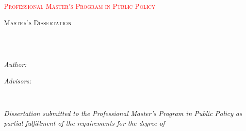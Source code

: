 \documentclass[12pt,oneside]{MastersDoctoralThesis_dry_en}
\author{Victor \textsc{Rangel}}
\begin{document}
\frontmatter
\pagestyle{plain}


\begin{titlepage}
\begin{center}

\vspace*{.06\textheight}
{\textcolor{Red}{\scshape\LARGE \bfseries \univname}\par}\vspace{.5cm}
{\textcolor{Red}{\scshape\large Professional Master's Program in Public Policy}\par}\vspace{1cm}

\textsc{\Large Master's Dissertation}\\[0.5cm]

\HRule \\[0.4cm]
{\huge \bfseries \ttitle\par}\vspace{0.4cm}
\HRule \\[1.5cm]
 
\begin{minipage}[t]{0.4\textwidth}
\begin{flushleft} \large
\emph{Author:}\\
{\textcolor{Red}{\authorname}}
\end{flushleft}
\end{minipage}
\begin{minipage}[t]{0.4\textwidth}
\begin{flushright} \large
\emph{Advisors:} \\
{\textcolor{Red}{\supname}}
\end{flushright}
\end{minipage}\\[3cm]
 
\vfill

\large \textit{Dissertation submitted to the Professional Master's Program in Public Policy as partial fulfillment of the requirements for the degree of}\\[0.3cm]
{\textcolor{red}{\deptname}}\\[1cm]

\vfill
\end{center}
\end{titlepage}

\end{document}
